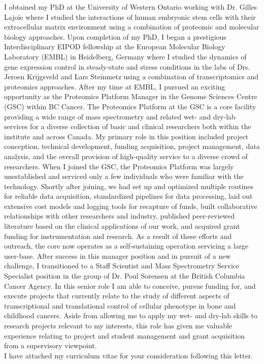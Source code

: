 \documentclass[11pt]{article}
\begin{document}
\noindent
I obtained my PhD at the University of Western Ontario working with Dr. Gilles Lajoie where I studied the interactions of human embryonic stem cells with their extracellular matrix environment using a combination of proteomic and molecular biology approaches. Upon completion of my PhD, I began a prestigious Interdisciplinary EIPOD fellowship at the European Molecular Biology Laboratory (EMBL) in Heidelberg, Germany where I studied the dynamics of gene expression control in steady-state and stress conditions in the labs of Drs. Jeroen Krijgsveld and Lars Steinmetz using a combination of transcriptomics and proteomics approaches. After my time at EMBL, I pursued an exciting opportunity as the Proteomics Platform Manager in the Genome Sciences Centre (GSC) within BC Cancer. The Proteomics Platform at the GSC is a core facility providing a wide range of mass spectrometry and related wet- and dry-lab services for a diverse collection of basic and clinical researchers both within the institute and across Canada. My primary role in this position included project conception, technical development, funding acquisition, project management, data analysis, and the overall provision of high-quality service to a diverse crowd of researchers. When I joined the GSC, the Proteomics Platform was largely unestablished and serviced only a few individuals who were familiar with the technology. Shortly after joining, we had set up and optimized multiple routines for reliable data acquisition, standardized pipelines for data processing, laid out extensive cost models and logging tools for recapture of funds, built collaborative relationships with other researchers and industry, published peer-reviewed literature based on the clinical applications of our work, and acquired grant funding for instrumentation and research. As a result of these efforts and outreach, the core now operates as a self-sustaining operation servicing a large user-base. After success in this manager position and in pursuit of a new challenge, I transitioned to a Staff Scientist and Mass Spectrometry Service Specialist position in the group of Dr. Poul Sorensen at the British Columbia Cancer Agency. In this senior role I am able to conceive, pursue funding for, and execute projects that currently relate to the study of different aspects of transcriptional and translational control of cellular phenotype in bone and childhood cancers. Aside from allowing me to apply my wet- and dry-lab skills to research projects relevant to my interests, this role has given me valuable experience relating to project and student management and grant acquisition from a supervisory viewpoint.\\

\noindent
I have attached my curriculum vitae for your consideration following this letter.
\end{document}
